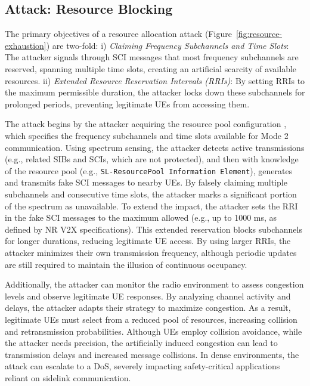 \subsection{Attack: Resource Blocking}

The primary objectives of a resource allocation attack (Figure~\ref{fig:resource-exhaustion}) are two-fold: i) \emph{Claiming Frequency Subchannels and Time Slots}: The attacker signals through SCI messages that most frequency subchannels are reserved, spanning multiple time slots, creating an artificial scarcity of available resources. ii) \emph{Extended Resource Reservation Intervals (RRIs)}: By setting RRIs to the maximum permissible duration, the attacker locks down these subchannels for prolonged periods, preventing legitimate UEs from accessing them.

The attack begins by the attacker acquiring the resource pool configuration , which specifies the frequency subchannels and time slots available for Mode 2 communication. Using spectrum sensing, the attacker detects active transmissions (e.g., related SIBs and SCIs, which are not protected), and then with knowledge of the resource pool (e.g., \texttt{SL-ResourcePool Information Element}), generates and transmits fake SCI messages to nearby UEs. By falsely claiming multiple subchannels and consecutive time slots, the attacker marks a significant portion of the spectrum as unavailable. To extend the impact, the attacker sets the RRI in the fake SCI messages to the maximum allowed (e.g., up to 1000 ms, as defined by NR V2X specifications). This extended reservation blocks subchannels for longer durations, reducing legitimate UE access. By using larger RRIs, the attacker minimizes their own transmission frequency, although periodic updates are still required to maintain the illusion of continuous occupancy.

Additionally, the attacker can monitor the radio environment to assess congestion levels and observe legitimate UE responses. By analyzing channel activity and delays, the attacker adapts their strategy to maximize congestion. As a result, legitimate UEs must select from a reduced pool of resources, increasing collision and retransmission probabilities. Although UEs employ collision avoidance, while the attacker needs precision, the artificially induced congestion can lead to transmission delays and increased message collisions. In dense environments, the attack can escalate to a DoS, severely impacting safety-critical applications reliant on sidelink communication.

